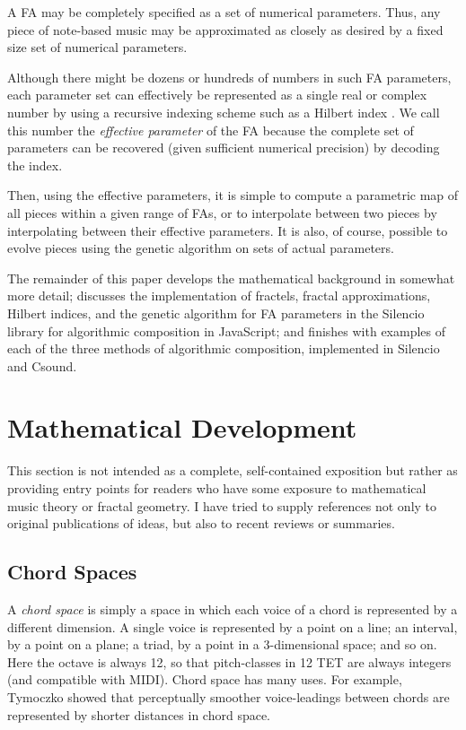 \documentclass[english,11pt,letterpaper,onecolumn]{scrartcl}
\numberwithin{equation}{section}
\begin{document}
A FA may be completely specified as a set of numerical parameters. Thus, any
piece of note-based music may be approximated as closely as desired by a fixed
size set of numerical parameters.

Although there might be dozens or hundreds of numbers in such FA parameters,
each parameter set can effectively be represented as a single real or complex
number by using a recursive indexing scheme such as a Hilbert index
\cite{hamilton2006compact}. We call this number the \textit{effective parameter}
of the FA because the complete set of parameters can be recovered (given
sufficient numerical precision) by decoding the index.

Then, using the effective parameters, it is simple to compute a parametric map
of all pieces within a given range of FAs, or to interpolate between two pieces
by interpolating between their effective parameters. It is also, of course,
possible to evolve pieces using the genetic algorithm on sets of actual
parameters.

The remainder of this paper develops the mathematical background in somewhat
more detail; discusses the implementation of fractels, fractal approximations,
Hilbert indices, and the genetic algorithm for FA parameters in the Silencio
library for algorithmic composition in JavaScript; and finishes with examples of
each of the three methods of algorithmic composition, implemented in Silencio
and Csound.

\section{Mathematical Development}

This section is not intended as a complete, self-contained exposition but rather
as providing entry points for readers who have some exposure to mathematical
music theory or fractal geometry. I have tried to supply references not only to
original publications of ideas, but also to recent reviews or summaries.

\subsection{Chord Spaces}

A \textit{chord space} is simply a space in which each voice of a chord is
represented by a different dimension. A single voice is represented by a point
on a line; an interval, by a point on a plane; a triad, by a point in a
3-dimensional space; and so on. Here the octave is always 12, so that
pitch-classes in 12 TET are always integers (and compatible with MIDI). Chord
space has many uses. For example, Tymoczko \cite{tymoczko2006geometry,
tymoczko2011geometry} showed that perceptually smoother voice-leadings between
chords are represented by shorter distances in chord space.
\end{document}
